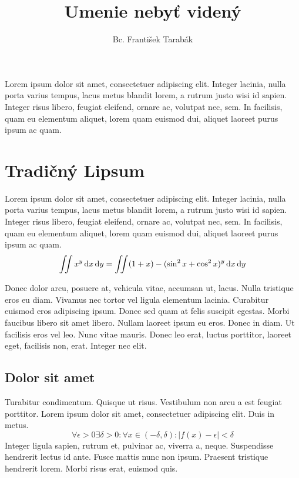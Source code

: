 \documentclass[thesismargins, thesislinespacing, twoside, upjsfrontpage]{rnthesis}
\title{Umenie nebyť videný}
\author{Bc. František Tarabák}
\begin{document}
\maketitle
\newpage
\tableofcontents
\listoffigures
\listoftables

\uvod

Lorem ipsum dolor sit amet, consectetuer adipiscing elit.
Integer lacinia, nulla porta varius tempus, lacus metus blandit
lorem, a rutrum justo wisi id sapien. Integer risus libero,
feugiat eleifend, ornare ac, volutpat nec, sem. In facilisis,
quam eu elementum aliquet, lorem quam euismod dui, aliquet
laoreet purus ipsum ac quam. 


\chapter{Tradičný Lipsum}

Lorem ipsum dolor sit amet, consectetuer adipiscing elit.
Integer lacinia, nulla porta varius tempus, lacus metus blandit
lorem, a rutrum justo wisi id sapien. Integer risus libero,
feugiat eleifend, ornare ac, volutpat nec, sem. In facilisis,
quam eu elementum aliquet, lorem quam euismod dui, aliquet
laoreet purus ipsum ac quam. 
%
$$\int\!\!\!\int x^y\,{\rm d}x\,{\rm d}y = \int\!\!\!\int (1 + x) - (\sin^2 x + \cos^2 x)^y\,{\rm d}x\,{\rm d}y$$

Donec dolor arcu, posuere at, vehicula vitae, accumsan ut,
lacus. Nulla tristique eros eu diam. Vivamus nec tortor vel
ligula elementum lacinia. Curabitur euismod eros adipiscing
ipsum. Donec sed quam at felis suscipit egestas. Morbi faucibus
libero sit amet libero. Nullam laoreet ipsum eu eros. Donec in
diam. Ut facilisis eros vel leo. Nunc vitae mauris. Donec leo
erat, luctus porttitor, laoreet eget, facilisis non, erat.
Integer nec elit.

\section{Dolor sit amet}

Turabitur condimentum. Quisque ut risus. Vestibulum non arcu a
est feugiat porttitor. Lorem ipsum dolor sit amet, consectetuer
adipiscing elit. Duis in metus. 
%
$$\forall \epsilon>0 \exists \delta>0:\forall x\in(-\delta,\delta):|f(x)-\epsilon|<\delta$$
%
Integer ligula sapien, rutrum et, pulvinar ac, viverra a,
neque. Suspendisse hendrerit lectus id ante. Fusce mattis nunc
non ipsum. Praesent tristique hendrerit lorem. Morbi risus
erat, euismod quis.
\end{document}
